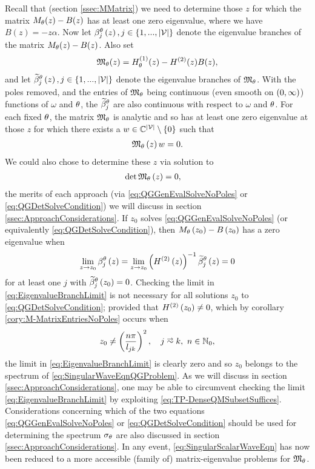 Recall that (section \ref{ssec:MMatrix}) we need to determine those $z$ for which the matrix $M_\theta(z)-B(z)$ has at least one zero eigenvalue, where we have $B(z) = -z\alpha$.
Now let $\beta_j^{\theta}\left( z \right), j\in\left\{ 1,...,\left\lvert \mathcal{V} \right\rvert \right\}$ denote the eigenvalue branches of the matrix $M_\theta(z)-B(z)$.
Also set 
\begin{align*}
	\mathfrak{M}_\theta(z) = H^{(1)}_\theta(z) - H^{(2)}(z)B(z),
\end{align*}
and let $\widetilde{\beta}_j^{\theta}\left( z \right), j\in\left\{ 1,...,\left\lvert \mathcal{V} \right\rvert \right\}$ denote the eigenvalue branches of $\mathfrak{M}_\theta$.
With the poles removed, and the entries of $\mathfrak{M}_\theta$ being continuous (even smooth on $\left( 0,\infty \right)$) functions of $\omega$ and $\theta$, the $\widetilde{\beta}_j^{\theta}$ are also continuous with respect to $\omega$ and $\theta$.
For each fixed $\theta$, the matrix $\mathfrak{M}_\theta$ is analytic and so has at least one zero eigenvalue at those $z$ for which there exists a $w\in\mathbb{C}^{\left\lvert \mathcal{V} \right\rvert}\setminus\left\{ 0 \right\}$ such that
\begin{align} \label{eq:QGGenEvalSolveNoPoles}
	\mathfrak{M}_\theta\left( z \right)w = 0.
\end{align}
We could also chose to determine these $z$ via solution to 
\begin{align} \label{eq:QGDetSolveCondition}
	\det\mathfrak{M}_\theta\left( z \right) &= 0,
\end{align}
the merits of each approach (via \eqref{eq:QGGenEvalSolveNoPoles} or \eqref{eq:QGDetSolveCondition}) we will discuss in section \ref{ssec:ApproachConsiderations}.
If $z_0$ solves \eqref{eq:QGGenEvalSolveNoPoles} (or equivalently \eqref{eq:QGDetSolveCondition}), then $M_{\theta}\left( z_0 \right)-B\left( z_0 \right)$ has a zero eigenvalue when
\begin{align} \label{eq:EigenvalueBranchLimit}
	\lim_{z\rightarrow z_0} \beta_j^{\theta}\left( z \right) = \lim_{z\rightarrow z_0} \left(  H^{(2)}\left( z \right)  \right)^{-1} \widetilde{\beta}_j^{\theta}\left( z \right) = 0
\end{align}
for at least one $j$ with $\widetilde{\beta}_j^{\theta}\left( z_0 \right)=0$.
Checking the limit in \eqref{eq:EigenvalueBranchLimit} is not necessary for all solutions $z_0$ to \eqref{eq:QGDetSolveCondition}; provided that $H^{(2)}\left( z_0 \right)\neq 0$, which by corollary \ref{cory:M-MatrixEntriesNoPoles} occurs when
\begin{align} \label{eq:H2ZerosEqn}
	z_0 \neq \bracs{ \frac{n\pi}{l_{jk}} }^2, \quad j\conLeft k, \ n\in\naturals_{0},
\end{align}
the limit in \eqref{eq:EigenvalueBranchLimit} is clearly zero and so $z_0$ belongs to the spectrum of \eqref{eq:SingularWaveEqnQGProblem}.
As we will discuss in section \ref{ssec:ApproachConsiderations}, one may be able to circumvent checking the limit \eqref{eq:EigenvalueBranchLimit} by exploiting \eqref{eq:TP-DenseQMSubsetSuffices}.
Considerations concerning which of the two equations \eqref{eq:QGGenEvalSolveNoPoles} or \eqref{eq:QGDetSolveCondition} should be used for determining the spectrum $\sigma_\theta$ are also discussed in section \ref{ssec:ApproachConsiderations}.
In any event, \eqref{eq:SingularScalarWaveEqn} has now been reduced to a more accessible (family of) matrix-eigenvalue problems for $\mathfrak{M}_\theta$.

